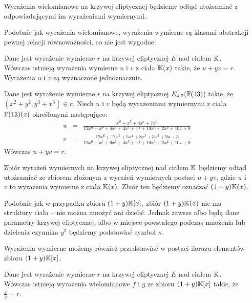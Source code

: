 \begin{remark}
Wyrażenia wielomianowe na krzywej eliptycznej
będziemy odtąd utożsamiać z odpowiadającymi im wyrażeniami wymiernymi.
\end{remark}

\noindent
Podobnie jak wyrażenia wielomianowe,
wyrażenia wymierne są klasami abstrakcji pewnej relacji równoważności,
co nie jest wygodne.

\begin{theorem}
Dane jest wyrażenie wymierne $r$ na krzywej eliptycznej $E$ nad ciałem $\mathbb{K}$.
Wówczas istnieją wyrażenia wymierne $u$ i $v$ z ciała $\mathbb{K}(x)$ takie,
że $u + yv = r$.
Wyrażenia $u$ i $v$ są wyznaczone jednoznacznie.
\end{theorem}

\begin{example}
Dane jest wyrażenie wymierne $r$
na krzywej eliptycznej $E_{4,7}(\mathbb{F}(13))$ takie,
że $(x^2 + y^2, y^3 + x^3) \in r$.
Niech $u$ i $v$ będą wyrażeniami wymiernymi z ciała $\mathbb{F}(13)(x)$
określonymi następująco:
\begin{eqnarray*}
u & = & \frac
    {x^6 + x^5 +4x^4 + 7x^3}
    {12x^9 + x^7 + 6x^6 + 4x^5 + x^4 + 10x^3 + 2x^2 + 10x + 8}
\\
v & = & \frac
    {12x^6 + 12x^5 + 5x^4 + 8x^3 + 3x^2 + 9x + 3}
    {12x^9 + x^7 + 6x^6 + 4x^5 + x^4 + 10x^3 + 2x^2 + 10x + 8}
\end{eqnarray*}
Wówczas $u + yv = r$.
\end{example}

\begin{remark}
Zbiór wyrażeń wymiernych na krzywej eliptycznej nad ciałem $\mathbb{K}$
będziemy odtąd utożsamiać ze zbiorem
złożonym z wyrażeń wymiernych postaci $u + yv$,
gdzie $u$ i $v$ to wyrażenia wymierne z ciała $\mathbb{K}(x)$.
Zbiór ten będziemy oznaczać $(1 + y)\mathbb{K}(x)$.
\end{remark}

\noindent
Podobnie jak w przypadku zbioru $(1 + y)\mathbb{K}[x]$,
zbiór $(1 + y)\mathbb{K}(x)$ nie ma struktury ciała --
nie można mnożyć ani dzielić.
Jednak zawsze albo będą dane parametry krzywej eliptycznej,
albo w miejsce powstałego podczas mnożenia lub dzielenia czynnika $y^2$
będziemy podstawiać symbol $\kappa$.

\noindent
Wyrażenia wymierne możemy również przedstawiać w postaci ilorazu
elementów zbioru $(1 + y)\mathbb{K}[x]$.

\begin{theorem}
Dane jest wyrażenie wymierne $r$ na krzywej eliptycznej $E$ nad ciałem $\mathbb{K}$.
Wówczas istnieją wyrażenia wielomianowe $f$ i $g$
ze zbioru $(1 + y)\mathbb{K}[x]$ takie,
że $\frac{f}{g} = r$.
\end{theorem}


